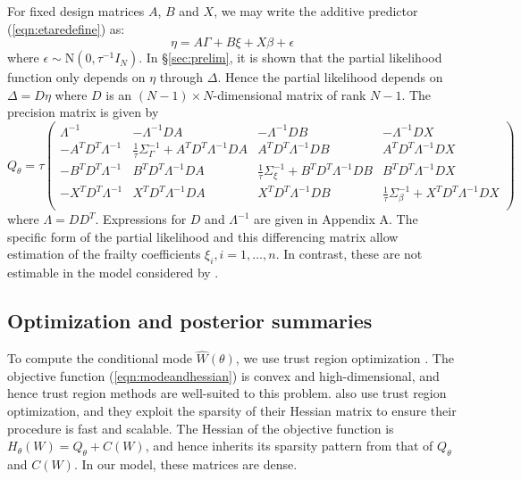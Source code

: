 \documentclass[]{article}
\begin{document}
For fixed design matrices $A$, $B$ and $X$, we may write the additive predictor (\ref{eqn:etaredefine}) as:
\begin{equation}
\eta = A\Gamma + B\xi + X\beta + \epsilon
\end{equation}
where $\epsilon \sim \text{N}\left( 0,\tau^{-1}I_{N}\right)$.
In \S\ref{sec:prelim}, it is shown that the partial likelihood function only depends on $\eta$ through $\Delta$. Hence the partial likelihood depends on $\Delta = D\eta$ where $D$ is an $(N -1) \times N $-dimensional matrix of rank $N -1$. The precision matrix is given by
\begin{equation}\label{eqn:precmat}
Q_{\theta} = \tau\begin{pmatrix}
\Lambda^{-1} & -\Lambda^{-1}DA & -\Lambda^{-1}DB & - \Lambda^{-1}DX \\
- A^{T}D^{T}\Lambda^{-1} & \frac{1}{\tau}\Sigma_{\Gamma}^{-1} +  A^{T}D^{T}\Lambda^{-1}DA &  A^{T}D^{T}\Lambda^{-1}DB &  A^{T}D^{T}\Lambda^{-1}DX \\
- B^{T}D^{T}\Lambda^{-1} &  B^{T}D^{T}\Lambda^{-1}DA & \frac{1}{\tau}\Sigma_{\xi}^{-1} +  B^{T}D^{T}\Lambda^{-1}DB & B^{T}D^{T}\Lambda^{-1}DX \\
- X^{T}D^{T}\Lambda^{-1} &  X^{T}D^{T}\Lambda^{-1}DA & X^{T}D^{T}\Lambda^{-1}DB & \frac{1}{\tau}\Sigma_{\beta}^{-1} +  X^{T}D^{T}\Lambda^{-1}DX \\
\end{pmatrix}
\end{equation}
where $\Lambda = DD^{T}$. Expressions for $D$ and $\Lambda^{-1}$ are given in Appendix A. The specific form of the partial likelihood and this differencing matrix allow estimation of the frailty coefficients $\xi_{i},i = 1,\ldots,n$. In contrast, these are not estimable in the model considered by \citet{casecross}.

\subsection{Optimization and posterior summaries}\label{subsec:opt}

To compute the conditional mode $\hat{W}(\theta)$, we use trust region optimization \citep{trustoptim}. The objective function (\ref{eqn:modeandhessian}) is convex and high-dimensional, and hence trust region methods are well-suited to this problem. \citet{casecross} also use trust region optimization, and they exploit the sparsity of their Hessian matrix to ensure their procedure is fast and scalable. The Hessian of the objective function is $H_{\theta}(W) = Q_{\theta} + C(W)$, and hence inherits its sparsity pattern from that of $Q_{\theta}$ and $C(W)$. In our model, these matrices are dense.
\end{document}
